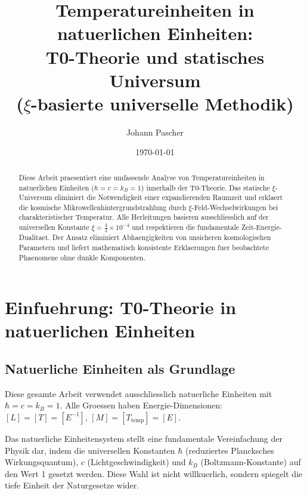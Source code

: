 \documentclass[12pt,a4paper]{article}
\begin{document}
	
	\title{Temperatureinheiten in natuerlichen Einheiten: \\
		T0-Theorie und statisches Universum \\
		($\xi$-basierte universelle Methodik)}
	\author{Johann Pascher}
	\date{\today}
	
	\maketitle
	
	\begin{abstract}
		Diese Arbeit praesentiert eine umfassende Analyse von Temperatureinheiten in natuerlichen Einheiten ($\hbar = c = k_B = 1$) innerhalb der T0-Theorie. Das statische $\xi$-Universum eliminiert die Notwendigkeit einer expandierenden Raumzeit und erklaert die kosmische Mikrowellenhintergrundstrahlung durch $\xi$-Feld-Wechselwirkungen bei charakteristischer Temperatur. Alle Herleitungen basieren ausschliesslich auf der universellen Konstante $\xi = \frac{4}{3} \times 10^{-4}$ und respektieren die fundamentale Zeit-Energie-Dualitaet. Der Ansatz eliminiert Abhaengigkeiten von unsicheren kosmologischen Parametern und liefert mathematisch konsistente Erklaerungen fuer beobachtete Phaenomene ohne dunkle Komponenten.
	\end{abstract}
	
	\tableofcontents
	\newpage
	
	\section{Einfuehrung: T0-Theorie in natuerlichen Einheiten}
	
	\subsection{Natuerliche Einheiten als Grundlage}
	
	\begin{important}
		Diese gesamte Arbeit verwendet ausschliesslich natuerliche Einheiten mit $\hbar = c = k_B = 1$. Alle Groessen haben Energie-Dimensionen: $[L] = [T] = [E^{-1}]$, $[M] = [T_{\text{temp}}] = [E]$.
	\end{important}
	
	Das natuerliche Einheitensystem stellt eine fundamentale Vereinfachung der Physik dar, indem die universellen Konstanten $\hbar$ (reduziertes Plancksches Wirkungsquantum), $c$ (Lichtgeschwindigkeit) und $k_B$ (Boltzmann-Konstante) auf den Wert 1 gesetzt werden. Diese Wahl ist nicht willkuerlich, sondern spiegelt die tiefe Einheit der Naturgesetze wider.
	
\end{document}
